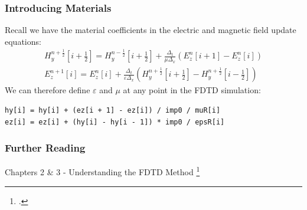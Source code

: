 \documentclass[10pt]{beamer}
\newcommand{\E}{\varepsilon}  %
\renewcommand{\u}{\mu}  %
\begin{document}
\begin{frame}[fragile]
    \frametitle{Introducing Materials}
 Recall we have the material coefficients in the electric and magnetic field update equations:
 \begin{align*}
    H_y^{n+\frac{1}{2}}\left[i+\frac{1}{2}\right] = H_y^{n-\frac{1}{2}}\left[i+\frac{1}{2}\right] +
    \frac{\Delta_t}{\u\Delta_x}
    \left(E_z^{n}\left[i+1\right] - E_z^{n}\left[i\right]\right) \\
    E_z^{n+1}\left[i\right] = E_z^{n}\left[i\right] +
    \frac{\Delta_t}{\E\Delta_x}
    \left(H_y^{n+\frac{1}{2}}\left[i+\frac{1}{2}\right] - H_y^{n+\frac{1}{2}}\left[i-\frac{1}{2}\right]\right)
 \end{align*}
    We can therefore define $\E$ and $\u$ at any point in the FDTD simulation:
    \begin{verbatim}
hy[i] = hy[i] + (ez[i + 1] - ez[i]) / imp0 / muR[i]
ez[i] = ez[i] + (hy[i] - hy[i - 1]) * imp0 / epsR[i]
    \end{verbatim}

\end{frame}

\begin{frame}
    \frametitle{Further Reading}

    Chapters 2 \& 3 - Understanding the FDTD Method \footcite{schneider_understanding_nodate}
  


\end{frame}





\end{document}

